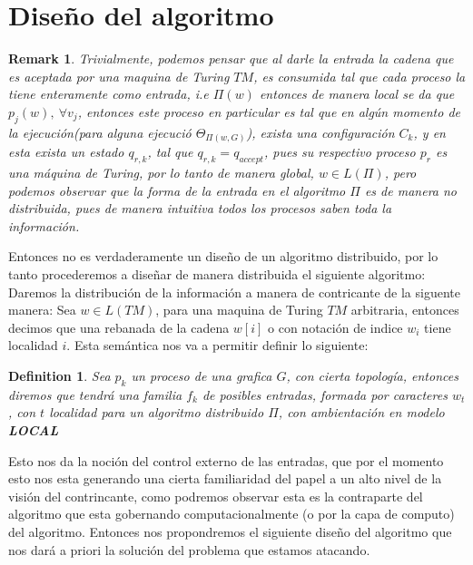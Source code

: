 \documentclass[10pt]{report}
\newtheorem*{remark}{Remark}
\newtheorem{definition}{Definition}
\begin{document}
{    \section{Diseño del algoritmo}\label{sec:diseño-del-algoritmo}
    \begin{remark}
        Trivialmente, podemos pensar que al darle la entrada la cadena que es aceptada por una maquina de Turing $TM$,\space
        es consumida tal que cada proceso la tiene enteramente como entrada, i.e $\Pi(w)$ entonces de manera local se da
        que $p_{j}(w),\ \forall v_{j}$, entonces este proceso en particular es tal que en algún momento de la ejecución(para alguna ejecució $\Theta_{\Pi(w,G)}$),
        exista una configuración $C_{k}$, y en esta exista un estado $q_{r,k}$, tal que $q_{r,k} = q_{accept}$, pues su respectivo proceso $p_{r}$ es una máquina de Turing,
        por lo tanto de manera global, $w\in L(\Pi)$, pero podemos observar que la forma de la entrada en el algoritmo $\Pi$
        es de manera no distribuida, pues de manera intuitiva todos los procesos saben toda la información.
    \end{remark}
    Entonces no es verdaderamente un diseño de un algoritmo distribuido, por lo tanto procederemos a diseñar de manera
    distribuida el siguiente algoritmo:
    \newline
    Daremos la distribución de la información a manera de contricante de la siguente manera:\newline
    Sea $w\in L(TM)$, para una maquina de Turing $TM$ arbitraria, entonces decimos que una rebanada de la cadena
    $w[i]$ o con notación de indice $w_{i}$ tiene localidad $i$.\newline
    Esta semántica nos va a permitir definir lo siguiente:
    \theoremstyle{definition}
    \begin{definition}
        Sea $p_{k}$ un proceso de una grafica $G$, con cierta topología, entonces
        diremos que tendrá una familia $f_{k}$ de posibles entradas, formada por caracteres $w_{t}$, con $t$ localidad para un algoritmo
        distribuido $\Pi$, con ambientación en modelo \textbf{LOCAL}

    \end{definition}
    Esto nos da la noción del control externo de las entradas, que por el momento esto nos esta generando
    una cierta familiaridad del papel a un alto nivel de la visión del contrincante, como podremos observar
    esta es la contraparte del algoritmo que esta gobernando computacionalmente (o por la capa de computo)
    del algoritmo.
    \space
    Entonces nos propondremos el siguiente diseño del algoritmo que nos dará a priori
    la solución del problema que estamos atacando.

}
\end{document}
